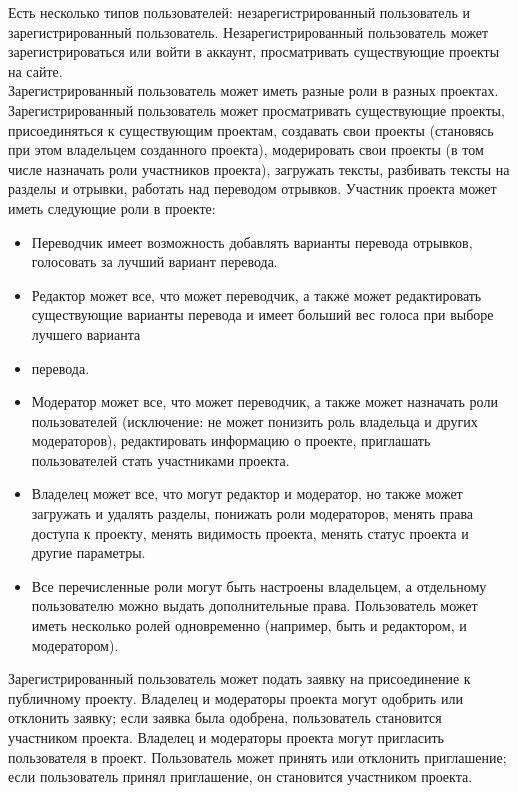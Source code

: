 \documentclass[a4paper,12pt]{article}
\begin{document}
Есть несколько типов пользователей: незарегистрированный пользователь и зарегистрированный пользователь. Незарегистрированный пользователь может зарегистрироваться или войти в аккаунт, просматривать существующие проекты на сайте.\\

Зарегистрированный пользователь может иметь разные роли в разных проектах. Зарегистрированный пользователь может просматривать существующие проекты, присоединяться к существующим проектам, создавать свои проекты (становясь при этом владельцем созданного проекта), модерировать свои проекты (в том числе назначать роли участников проекта), загружать тексты, разбивать тексты на разделы и отрывки, работать над переводом отрывков. Участник проекта может иметь следующие роли в проекте:
\begin{itemize}
\item Переводчик имеет возможность добавлять варианты перевода отрывков, голосовать за лучший вариант перевода.
\item Редактор может все, что может переводчик, а также может редактировать существующие варианты перевода и имеет больший вес голоса при выборе лучшего варианта \item перевода.
\item Модератор может все, что может переводчик, а также может назначать роли пользователей (исключение: не может понизить роль владельца и других модераторов), редактировать информацию о проекте, приглашать пользователей стать участниками проекта.
\item Владелец может все, что могут редактор и модератор, но также может загружать и удалять разделы, понижать роли модераторов, менять права доступа к проекту, менять видимость проекта, менять статус проекта и другие параметры.
\item Все перечисленные роли могут быть настроены владельцем, а отдельному пользователю можно выдать дополнительные права. Пользователь может иметь несколько ролей одновременно (например, быть и редактором, и модератором).
\end{itemize}

Зарегистрированный пользователь может подать заявку на присоединение к публичному проекту. Владелец и модераторы проекта могут одобрить или отклонить заявку; если заявка была одобрена, пользователь становится участником проекта. Владелец и модераторы проекта могут пригласить пользователя в проект. Пользователь может принять или отклонить приглашение; если пользователь принял приглашение, он становится участником проекта.
\end{document}
